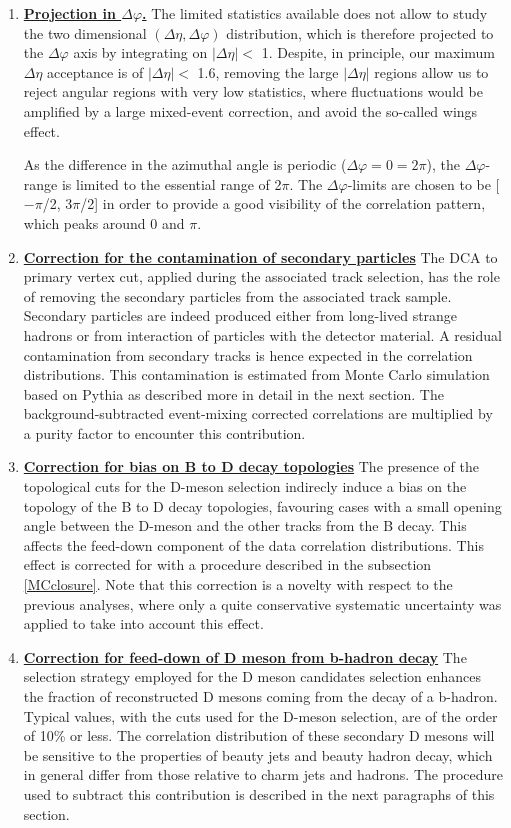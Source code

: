 \begin{enumerate}
\item
\underline{\bf Projection in $\Delta\varphi$.}
The limited statistics available does not allow to study the two dimensional
$(\Delta\eta,\Delta\varphi)$ distribution, which is therefore projected to the $\Delta\varphi$ axis by integrating on $|\Delta\eta| <$ 1. Despite, in principle, our maximum $\Delta\eta$ acceptance is of $|\Delta\eta| <$ 1.6, removing the large $|\Delta\eta|$ regions allow us to reject angular regions with very low statistics, where fluctuations would be amplified by a large mixed-event correction, and avoid the so-called wings effect.

As the difference in the azimuthal angle is periodic ($\Delta \varphi = 0 = 2\pi$), the $\Delta\varphi$-range is limited to the essential range of 2$\pi$. The $\Delta \varphi$-limits are chosen to be [$-\pi$/2, 3$\pi$/2] in order to provide a good visibility of the correlation pattern, which peaks around 0 and $\pi$.

\item
\underline{\bf Correction for the contamination of secondary particles}
The DCA to primary vertex cut, applied during the associated track selection, has the role of removing the secondary particles from the associated track sample.
Secondary particles are indeed produced either from long-lived strange hadrons or from interaction of particles with the detector material. A residual contamination from secondary tracks is hence expected in the correlation distributions. This contamination is estimated from Monte Carlo simulation
based on Pythia as described more in detail in the next section. The background-subtracted
event-mixing corrected correlations are multiplied by a purity factor to encounter this contribution.

\item
\underline{\bf Correction for bias on B to D decay topologies}
The presence of the topological cuts for the D-meson selection indirecly induce a bias on the topology of the B to D decay topologies, favouring cases with a small opening angle between the D-meson and the other tracks from the B decay. This affects the feed-down component of the data correlation distributions. This effect is corrected for with a procedure described in the subsection \ref{MCclosure}. Note that this correction is a novelty with respect to the previous analyses, where only a quite conservative systematic uncertainty was applied to take into account this effect.

\item
\underline{\bf Correction for feed-down of D meson from b-hadron decay}
The selection strategy employed for the D meson candidates selection %
enhances the fraction of reconstructed D mesons coming from the decay of a b-hadron. Typical values, with the cuts used for the D-meson selection, are of the order of 10\% or less. The correlation distribution of these secondary D mesons will be sensitive to the properties of beauty jets and beauty hadron decay, which in general differ from those relative to charm jets and hadrons. The procedure used to subtract this contribution is described in the next paragraphs of this section.


\end{enumerate}
